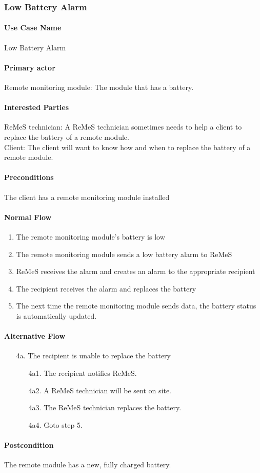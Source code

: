 \subsubsection{Low Battery Alarm}

\paragraph{Use Case Name}
Low Battery Alarm
\paragraph{Primary actor}
Remote monitoring module: The module that has a battery.
\paragraph{Interested Parties}
ReMeS technician: A ReMeS technician sometimes needs to help a client to replace the battery of a remote module. \\
Client: The client will want to know how and when to replace the battery of a remote module.
\paragraph{Preconditions}
The client has a remote monitoring module installed
\paragraph{Normal Flow}
\begin{enumerate}
	\item The remote monitoring module's battery is low
	\item The remote monitoring module sends a low battery alarm to ReMeS
	\item ReMeS receives the alarm and creates an alarm to the appropriate recipient
	\item The recipient receives the alarm and replaces the battery
	\item The next time the remote monitoring module sends data, the battery status is automatically updated.
\end{enumerate}

\paragraph{Alternative Flow}
\begin{enumerate}
	\item[4a.] The recipient is unable to replace the battery
	\begin{enumerate}
		\item[4a1.] The recipient notifies ReMeS.
		\item[4a2.] A ReMeS technician will be sent on site.
		\item[4a3.] The ReMeS technician replaces the battery.
		\item[4a4.] Goto step 5.
	\end{enumerate}
\end{enumerate}

\paragraph{Postcondition}
The remote module has a new, fully charged battery.
